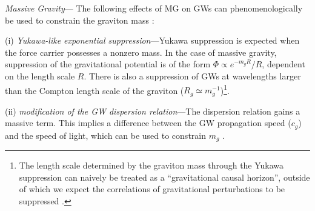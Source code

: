 \documentclass[prd,twocolumn,aps,psfig,nofootinbib,nobibnotes,superscriptaddress,preprintnumbers,times]{revtex4-2}
\begin{document}
\textit{Massive Gravity}---
The following effects of MG on GWs can phenomenologically be used to constrain the graviton mass \cite{deRham:2016nuf}:

(i) \textit{Yukawa-like exponential suppression}---Yukawa suppression is expected when the force carrier possesses a nonzero mass. In the case of massive gravity, suppression of the gravitational potential is of the form $\Phi \propto e^{-m_gR}/R$, dependent on the length scale $R$. There is also a suppression of GWs at wavelengths larger than the Compton length scale of the graviton ($R_g \simeq m_g^{-1}$)\footnote{The length scale determined by the graviton mass through the Yukawa suppression can naively be treated as a ``gravitational causal horizon'', outside of which we expect the correlations of gravitational perturbations to be suppressed \cite{Will:1997bb}.}.

(ii) \textit{modification of the GW dispersion relation}---The dispersion relation gains a massive term. This implies a difference between the GW propagation speed ($c_g$) and the speed of light, which can be used to constrain $m_g$ \cite{LIGOScientific:2017vwq, LIGOScientific:2017zic, LIGOScientific:2017ync}. 
\end{document}
